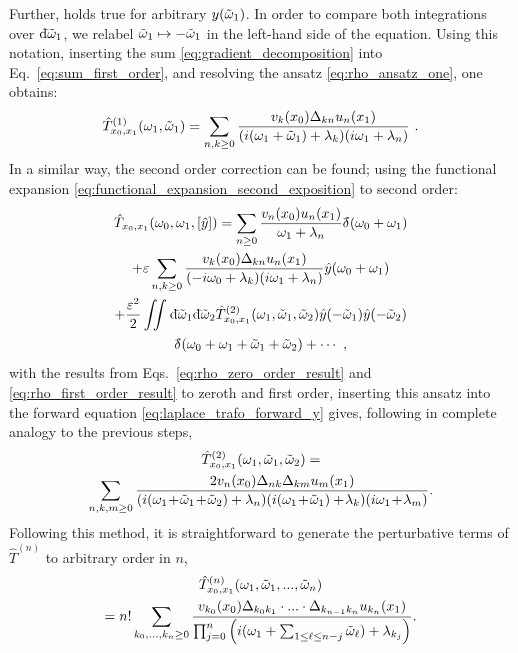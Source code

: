 \documentclass[%
 reprint,
superscriptaddress,
nofootinbib,
 amsmath,amssymb,
 aps,
prx,
]{revtex4-2}
\begin{document}
Further,  holds true for arbitrary $y(\tilde{\omega}_1)$. In order to compare both integrations over $\mathrm{d}\hspace*{-0.08em}\bar{}\hspace*{0.1em} \tilde{\omega}_1$, we relabel $\tilde{\omega}_1 \mapsto - \tilde{\omega}_1$ in the left-hand side of the equation.
Using this notation, inserting the sum \eqref{eq:gradient_decomposition} into Eq.~\eqref{eq:sum_first_order}, and resolving the ansatz \eqref{eq:rho_ansatz_one}, one obtains:
\begin{align}
	\hat{T}^{(1)}_{x_0,x_1}(\omega_1,\tilde{\omega}_1) = \sum_{n,k \geq0}^{} \frac{v_k(x_0)\Delta_{kn} u_{n}(x_1) }{(i(\omega_1+\tilde{\omega}_1)+\lambda_k)(i\omega_1 + \lambda_n)}~.
	\label{eq:rho_first_order_result}
\end{align}
In a similar way, the second order correction can be found; using the functional expansion \eqref{eq:functional_expansion_second_exposition} to second order:
\begin{multline}
	\hat{T}_{x_0,x_1}(\omega_0,\omega_1,[\hat{y}]) = \sum_{n \geq 0}^{}\frac{v_n(x_0)u_n(x_1)}{\omega_1+\lambda_n}\delta\hspace*{-0.24em}\bar{}\hspace*{0.1em}\,(\omega_0 + \omega_1) \\
	+ \varepsilon \sum_{n,k \geq 0}^{} \frac{v_k(x_0)\Delta_{kn} u_{n}(x_1) }{(-
	i\omega_0+\lambda_k)(i\omega_1 + \lambda_n)} \hat{y}(\omega_0 + \omega_1) \\
	+ \frac{\varepsilon^2 }{2}\iint_{}^{} \mathrm{d}\hspace*{-0.08em}\bar{}\hspace*{0.1em}{\tilde{\omega}_1} \mathrm{d}\hspace*{-0.08em}\bar{}\hspace*{0.1em}{\tilde{\omega}_2} \hat{T}^{(2)}_{x_0,x_1}(\omega_1,\tilde{\omega}_1,\tilde{\omega}_2)\hat{y}(-\tilde{\omega}_1)\hat{y}(-\tilde{\omega}_2) \\\delta\hspace*{-0.24em}\bar{}\hspace*{0.1em}\,(\omega_0+\omega_1+\tilde{\omega}_1+\tilde{\omega}_2)
	+ \cdots~,
	\label{}
\end{multline}
with the results from Eqs.~\eqref{eq:rho_zero_order_result} and \eqref{eq:rho_first_order_result} to zeroth and first order, inserting this ansatz into the forward equation \eqref{eq:laplace_trafo_forward_y} gives, following in complete analogy to the previous steps,
\begin{multline}
	\hat{T}^{(2)}_{x_0,x_1}(\omega_1, \ts_1, \ts_2) = \\
	\sum_{n,k,m \geq0}^{} \frac{2v_n(x_0)\deriv_{nk}\deriv_{km}u_m(x_1)}{(i(\omega_1\!+\!\ts_1\!+\!\ts_2)+\lambda_n)(i(\omega_1\!+\!\ts_1)+\!\lambda_k)(i\omega_1\!+\!\lambda_{m})}.
	\label{eq:rho_second_order_result}
\end{multline}
Following this method, it is straightforward to generate the perturbative terms of $\hat{T}^{(n)}$  to arbitrary order in $n$,
\begin{multline}
   \hat{T}^{(n)}_{x_0,x_1}(\omega_1,\tilde{\omega}_1,...,\tilde{\omega}_n)
    \\ =n! \sum_{k_0,...,k_n\geq0} \frac{v_{k_0}(x_0)\Delta_{k_0k_1}\cdot...\cdot \Delta_{k_{n-1}k_n}u_{k_n}(x_1)}{ \prod_{j=0}^n \left(i(\omega_1 +\sum_{1\leq \ell\leq n-j} \tilde{\omega}_{\ell}) + \lambda_{k_{j}}\right)}.
    \label{eq:rho_n_order_result}
\end{multline}
\end{document}
